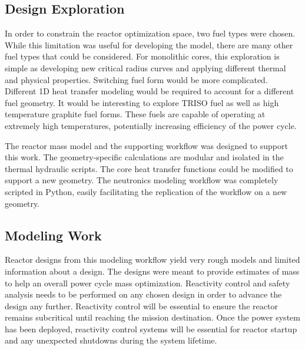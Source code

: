 \subsection{Design Exploration}
In order to constrain the reactor optimization space, two fuel types were
chosen. While this limitation was useful for developing the model, 
there are many other fuel types that could be considered. For monolithic
cores, this exploration is simple as developing new critical radius curves and
applying different thermal and physical properties. Switching fuel form would be
more complicated. Different 1D heat transfer modeling would be required to
account for a different fuel geometry. It would be interesting to explore
TRISO fuel as well as high temperature graphite fuel forms. These fuels are
capable of operating at extremely high temperatures, potentially increasing
efficiency of the power cycle.

The reactor mass model and the supporting workflow was designed to support this
work. The geometry-specific calculations are modular and isolated in the thermal
hydraulic scripts. The core heat transfer functions could be modified to support
a new geometry. The neutronics modeling workflow was completely scripted in
Python, easily facilitating the replication of the workflow on a new geometry.

\subsection{Modeling Work}
Reactor designs from this modeling workflow yield very rough models and limited
information about a design. The designs were meant to provide estimates of mass
to help an overall power cycle mass optimization. Reactivity control and safety
analysis needs to be performed on any chosen design in order to advance the
design any further. Reactivity control will be essential to ensure the reactor
remains subcritical until reaching the mission destination. Once the power
system has been deployed, reactivity control systems will be essential for
reactor startup and any unexpected shutdowns during the system lifetime.
